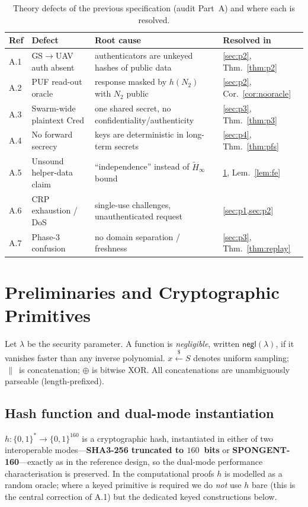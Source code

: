 \documentclass[11pt]{article}
\theoremstyle{plain}
\theoremstyle{definition}
\newcommand{\Cred}{\mathrm{Cred}}
\newcommand{\secpar}{\lambda}
\newcommand{\bits}{\{0,1\}}
\newcommand{\getsr}{\xleftarrow{\$}}
\newcommand{\negl}{\mathsf{negl}}
\newcommand{\entropy}{\widetilde{H}_\infty}
\newcommand{\catt}{\,\|\,}          %
\newcommand{\xor}{\oplus}
\begin{document}
\begin{table}[t]
\centering
\caption{Theory defects of the previous specification (audit Part~A) and
where each is resolved.}
\label{tab:flaws}
\small
\begin{tabularx}{\linewidth}{@{}l l X l@{}}
\toprule
\textbf{Ref} & \textbf{Defect} & \textbf{Root cause} & \textbf{Resolved in}\\
\midrule
A.1 & GS$\to$UAV auth absent & authenticators are unkeyed hashes of public data & \cref{sec:p2}, Thm.~\ref{thm:p2}\\
A.2 & PUF read-out oracle & response masked by $h(N_2)$ with $N_2$ public & \cref{sec:p2}, Cor.~\ref{cor:nooracle}\\
A.3 & Swarm-wide plaintext $\Cred$ & one shared secret, no confidentiality/authenticity & \cref{sec:p3}, Thm.~\ref{thm:p3}\\
A.4 & No forward secrecy & keys are deterministic in long-term secrets & \cref{sec:p4}, Thm.~\ref{thm:pfs}\\
A.5 & Unsound helper-data claim & ``independence'' instead of $\entropy$ bound & \cref{sec:prelim}, Lem.~\ref{lem:fe}\\
A.6 & CRP exhaustion / DoS & single-use challenges, unauthenticated request & \cref{sec:p1,sec:p2}\\
A.7 & Phase-3 confusion & no domain separation / freshness & \cref{sec:p3}, Thm.~\ref{thm:replay}\\
\bottomrule
\end{tabularx}
\end{table}

\section{Preliminaries and Cryptographic Primitives}
\label{sec:prelim}
Let $\secpar$ be the security parameter. A function is \emph{negligible},
written $\negl(\secpar)$, if it vanishes faster than any inverse polynomial.
$x\getsr S$ denotes uniform sampling; $\catt$ is concatenation; $\xor$ is
bitwise XOR. All concatenations are unambiguously parseable (length-prefixed).

\subsection{Hash function and dual-mode instantiation}
$h:\bits^\ast\to\bits^{160}$ is a cryptographic hash, instantiated in
either of two interoperable modes---\textbf{SHA3-256 truncated to
$160$~bits} or \textbf{SPONGENT-160}---exactly as in the reference design,
so the dual-mode performance characterisation is preserved. In the
computational proofs $h$ is modelled as a random oracle; where a keyed
primitive is required we do \emph{not} use $h$ bare (this is the central
correction of A.1) but the dedicated keyed constructions below.
\end{document}
